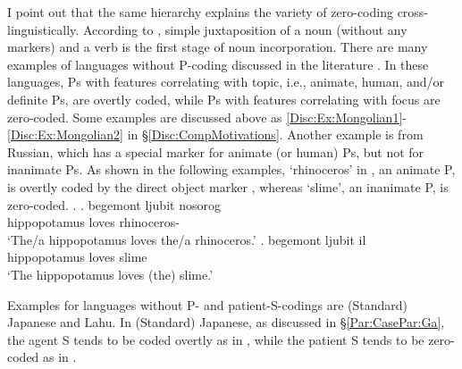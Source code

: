 I point out that the same hierarchy \Last explains the variety of zero-coding cross-linguistically.
According to ,
simple juxtaposition of a noun (without any markers) and a verb is the first stage of noun incorporation.
There are many examples of languages without P-coding discussed in the literature
\cite[]{comrie79,comrie83,croft03,aissen03,haspelmath08}.
In these languages,
Ps with features correlating with topic,
i.e.,  animate, human, and/or definite Ps,
are overtly coded,
while Ps with features correlating with focus
are zero-coded.
Some examples are discussed above as \ref{Disc:Ex:Mongolian1}-\ref{Disc:Ex:Mongolian2} in \S \ref{Disc:CompMotivations}.
Another example is from Russian,
which has a special marker for animate (or human) Ps,
but not for inanimate Ps.
As shown in the following examples,
 `rhinoceros' in \Next[a], an animate P,
is overtly coded by the direct object marker ,
whereas  `slime', an inanimate P,
is zero-coded.
%
\ex.
 \ag. begemont ljubit nosorog \\
      hippopotamus loves rhinoceros- \\
      `The/a hippopotamus loves the/a rhinoceros.'
 \bg. begemont ljubit il \\
      hippopotamus loves slime \\
      `The hippopotamus loves (the) slime.'

Examples for languages without P- and patient-S-codings are (Standard) Japanese and Lahu.
In (Standard) Japanese,
as discussed in \S \ref{Par:CasePar:Ga},
the agent S tends to be coded overtly as in \Next[a],
while the patient S tends to be zero-coded as in \Next[b-c]
\cite[p.\ 93]{kageyama93}.

